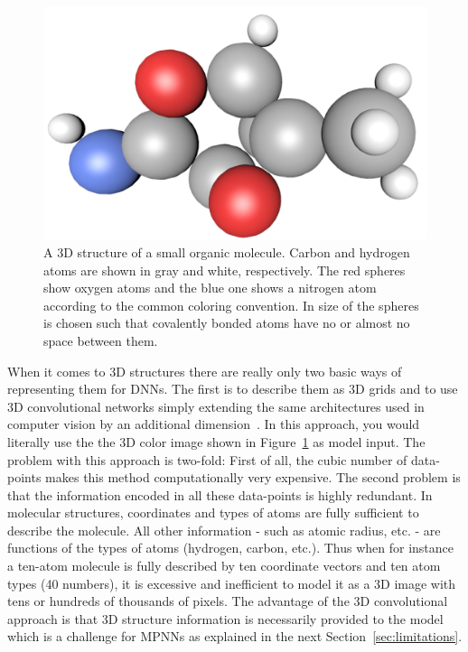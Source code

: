 \begin{figure}[H]
	\centering
	\includegraphics[width=\linewidth]{figures/molecule-3d-1}
	\caption{A 3D structure of a small organic molecule. Carbon and hydrogen atoms are shown in gray and white, respectively. The red spheres show oxygen atoms and the blue one shows a nitrogen atom according to the common coloring convention. In size of the spheres is chosen such that covalently bonded atoms have no or almost no space between them.
}
	\label{fig:molecule-3d}
\end{figure}

When it comes to 3D structures there are really only two basic ways of representing them for DNNs. The first is to describe them as 3D grids and to use 3D convolutional networks simply extending the same architectures used in computer vision by an additional dimension~\cite{Wallach2015}. In this approach, you would literally use the the 3D color image shown in Figure~\ref{fig:molecule-3d} as model input. The problem with this approach is two-fold: First of all, the cubic number of data-points makes this method computationally very expensive. The second problem is that the information encoded in all these data-points is highly redundant. In molecular structures, coordinates and types of atoms are fully sufficient to describe the molecule. All other information - such as atomic radius, etc. - are functions of the types of atoms (hydrogen, carbon, etc.). Thus when for instance a ten-atom molecule is fully described by ten coordinate vectors and ten atom types (40 numbers), it is excessive and inefficient to model it as a 3D image with tens or hundreds of thousands of pixels. The advantage of the 3D convolutional approach is that 3D structure information is necessarily provided to the model which is a challenge for MPNNs as explained in the next Section~\ref{sec:limitations}.



